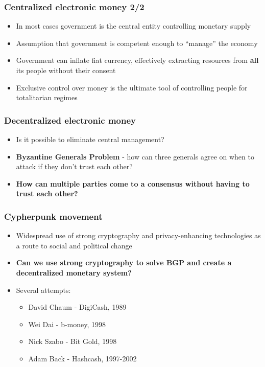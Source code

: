 \documentclass{beamer}
\begin{document}
\begin{frame}
  \frametitle{Centralized electronic money 2/2}
  \begin{itemize}
  \item In most cases government is the central entity controlling monetary
    supply
  \item Assumption that government is competent enough to ``manage'' the economy
  \item Government can inflate fiat currency, effectively extracting resources
    from \textbf{all} its people without their consent
  \item Exclusive control over money is the ultimate tool of controlling people
    for totalitarian regimes
  \end{itemize}
\end{frame}

\begin{frame}
  \frametitle{Decentralized electronic money}
  \begin{itemize}
  \item Is it possible to eliminate central management?
  \item \textbf{Byzantine Generals Problem} - how can three generals agree on when
    to attack if they don't trust each other?
  \item \textbf{How can multiple parties come to a consensus without having to
      trust each other?}
  \end{itemize}
\end{frame}

\begin{frame}
  \frametitle{Cypherpunk movement}
  \begin{itemize}
  \item Widespread use of strong cryptography and privacy-enhancing technologies
    as a route to social and political change
  \item \textbf{Can we use strong cryptography to solve BGP and create a
      decentralized monetary system?}
  \item Several attempts:
    \begin{itemize}
    \item David Chaum - DigiCash, 1989
    \item Wei Dai - b-money, 1998
    \item Nick Szabo - Bit Gold, 1998
    \item Adam Back - Hashcash, 1997-2002
    \end{itemize}
  \end{itemize}
\end{frame}
\end{document}
